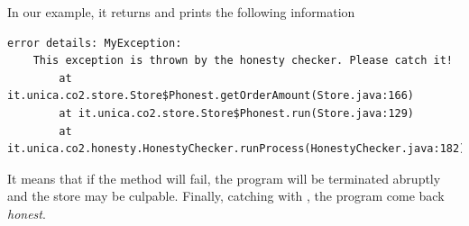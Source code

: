 In our example, it returns  and prints the following information
\begin{mdframed}
\begin{verbatim}
error details: MyException: 
    This exception is thrown by the honesty checker. Please catch it!
        at it.unica.co2.store.Store$Phonest.getOrderAmount(Store.java:166)
        at it.unica.co2.store.Store$Phonest.run(Store.java:129)
        at it.unica.co2.honesty.HonestyChecker.runProcess(HonestyChecker.java:182)
\end{verbatim}
\end{mdframed}
It means that if the method  will fail,
the program will be terminated abruptly and the store may be culpable.
Finally, catching  with ,
the program come back \emph{honest}.






